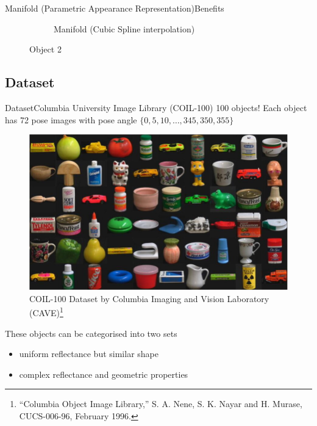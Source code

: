 \documentclass[aspectratio=169, handout, 10pt, hyperref=colorlinks]{beamer}
\begin{document}
\begin{frame}{Manifold (Parametric Appearance Representation)}{Benefits}
\begin{itemize}
\begin{figure}
\begin{subfigure}{0.45\linewidth}
            \caption{Manifold (Cubic Spline interpolation)}
        \end{subfigure}
        \caption{Object 2}
    \end{figure}
\end{itemize}
\end{frame}
\subsection{Dataset}
\begin{frame}{Dataset}{Columbia University Image Library
(COIL-100)}
100 objects! Each object has 72 pose images with pose angle $\{0,5,10,\ldots,345,350,355\}$
    \begin{figure}
        \centering
        \includegraphics[width=0.45\linewidth]{Sample-images-from-COIL-100-database.jpg}
        \caption{COIL-100 Dataset by Columbia Imaging and Vision Laboratory (CAVE)\footnote{``Columbia Object Image Library,''
S. A. Nene, S. K. Nayar and H. Murase, CUCS-006-96, February 1996.}}
        \label{fig:dataset}
    \end{figure}
\vspace{-1em}
These objects can be categorised into two sets
\begin{itemize}
    \item uniform reflectance but similar shape
    \item complex reflectance and geometric properties
\end{itemize}
\end{frame}
\end{document}
